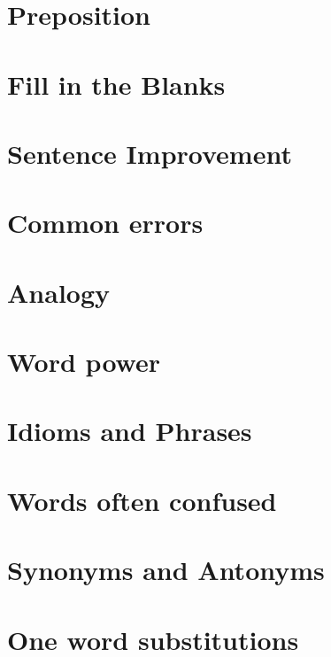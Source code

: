 \documentclass[8pt]{report}
\begin{document}
\chapter{Preposition}
\chapter{Fill in the Blanks}
\chapter{Sentence Improvement}
\chapter{Common errors}
\chapter{Analogy}
\chapter{Word power}
\chapter{Idioms and Phrases}
\chapter{Words often confused}
\chapter{Synonyms and Antonyms}
\chapter{One word substitutions}
\end{document}
